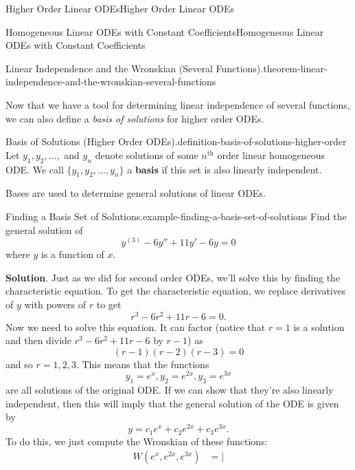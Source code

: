 \documentclass[10pt,]{book}
\newcommand{\terminology}[1]{\textbf{#1}}
\numberwithin{equation}{section}
\newcommand{\amp}{&}
\begin{document}
\begin{chapterptx}{Higher Order Linear ODEs}{}{Higher Order Linear ODEs}{}{}
\begin{sectionptx}{Homogeneous Linear ODEs with Constant Coefficients}{}{Homogeneous Linear ODEs with Constant Coefficients}{}{}
\begin{theorem}{Linear Independence and the Wronskian (Several Functions).}{}{theorem-linear-independence-and-the-wronskian-several-functions}
\end{theorem}
\hypertarget{p-264}{}%
Now that we have a tool for determining linear independence of several functions, we can also define a \emph{basis of solutions} for higher order ODEs.%
\begin{definition}{Basis of Solutions (Higher Order ODEs).}{definition-basis-of-solutions-higher-order}%
\hypertarget{p-265}{}%
Let \(y_{1}, y_{2},\ldots,\) and \(y_{n}\) denote solutions of some \(n^{\text{th}}\) order linear homogeneous ODE. We call \(\{y_{1},y_{2},\ldots,y_{n}\}\) a \terminology{basis} if this set is also linearly independent.%
\end{definition}
\hypertarget{p-266}{}%
Bases are used to determine general solutions of linear ODEs.%
\begin{example}{Finding a Basis Set of Solutions.}{example-finding-a-basis-set-of-solutions}%
\hypertarget{p-267}{}%
Find the general solution of%
\begin{equation*}
y^{(3)}-6y''+11y'-6y=0
\end{equation*}
where \(y\) is a function of \(x\).%
\par\smallskip%
\noindent\textbf{Solution}.\hypertarget{solution-38}{}\quad%
\hypertarget{p-268}{}%
Just as we did for second order ODEs, we'll solve this by finding the characteristic equation. To get the characteristic equation, we replace derivatives of \(y\) with powers of \(r\) to get%
\begin{equation*}
r^{3}-6r^{2}+11r-6=0.
\end{equation*}
Now we need to solve this equation. It can factor (notice that \(r=1\) is a solution and then divide \(r^{3}-6r^{2}+11r-6\) by \(r-1\)) as%
\begin{equation*}
(r-1)(r-2)(r-3)=0
\end{equation*}
and so \(r=1,2,3.\) This means that the functions%
\begin{equation*}
y_{1} = e^{x},y_{2} = e^{2x},y_{3} = e^{3x}
\end{equation*}
are all solutions of the original ODE. If we can show that they're also linearly independent, then this will imply that the general solution of the ODE is given by%
\begin{equation*}
y = c_{1}e^{x}+c_{2}e^{2x}+c_{3}e^{3x}.
\end{equation*}
To do this, we just compute the Wronskian of these functions:%
%
\begin{align*}
W(e^{x},e^{2x},e^{3x})
\amp= \left|

\end{align*}
\end{example}
\end{sectionptx}
\end{chapterptx}
\end{document}
